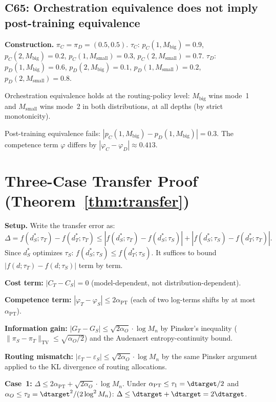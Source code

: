\documentclass[11pt]{article}
\newcommand{\Mn}{M_n}
\newcommand{\mismatch}{\varepsilon}
\begin{document}
\subsection{C65: Orchestration equivalence does not imply post-training equivalence}

\textbf{Construction.}
$\pi_C = \pi_D = (0.5, 0.5)$.
$\tau_C$: $p_C(1, M_{\mathrm{big}}) = 0.9$,
  $p_C(2, M_{\mathrm{big}}) = 0.2$,
  $p_C(1, M_{\mathrm{small}}) = 0.3$,
  $p_C(2, M_{\mathrm{small}}) = 0.7$.
$\tau_D$: $p_D(1, M_{\mathrm{big}}) = 0.6$,
  $p_D(2, M_{\mathrm{big}}) = 0.1$,
  $p_D(1, M_{\mathrm{small}}) = 0.2$,
  $p_D(2, M_{\mathrm{small}}) = 0.8$.

Orchestration equivalence holds at the routing-policy level:
$M_{\mathrm{big}}$ wins mode~1 and $M_{\mathrm{small}}$ wins mode~2
in both distributions, at all depths (by strict monotonicity).

Post-training equivalence fails:
$|p_C(1, M_{\mathrm{big}}) - p_D(1, M_{\mathrm{big}})| = 0.3$.
The competence term $\varphi$ differs by $|\varphi_C - \varphi_D|
\approx 0.413$.

\section{Three-Case Transfer Proof (Theorem~\ref{thm:transfer})}
\label{app:transfer}

\textbf{Setup.}
Write the transfer error as:
\[
  \Delta = f(d_S^*; \tau_T) - f(d_T^*; \tau_T)
  \le |f(d_S^*; \tau_T) - f(d_S^*; \tau_S)|
    + |f(d_S^*; \tau_S) - f(d_T^*; \tau_T)|.
\]
Since $d_S^*$ optimizes $\tau_S$: $f(d_S^*; \tau_S) \le f(d_T^*; \tau_S)$.
It suffices to bound $|f(d; \tau_T) - f(d; \tau_S)|$ term by term.

\textbf{Cost term:} $|C_T - C_S| = 0$ (model-dependent, not
distribution-dependent).

\textbf{Competence term:}
$|\varphi_T - \varphi_S| \le 2\alpha_{\mathrm{PT}}$ (each of two
log-terms shifts by at most $\alpha_{\mathrm{PT}}$).

\textbf{Information gain:}
$|G_T - G_S| \le \sqrt{2\alpha_O} \cdot \log\Mn$ by Pinsker's inequality
($\|\pi_S - \pi_T\|_{\mathrm{TV}} \le \sqrt{\alpha_O/2}$) and the
Audenaert entropy-continuity bound.

\textbf{Routing mismatch:}
$|\mismatch_T - \mismatch_S| \le \sqrt{2\alpha_O} \cdot \log\Mn$
by the same Pinsker argument applied to the KL divergence of routing
allocations.

\textbf{Case~1:}
$\Delta \le 2\alpha_{\mathrm{PT}} + \sqrt{2\alpha_O}\cdot\log\Mn$.
Under $\alpha_{\mathrm{PT}} \le \tau_1 = \dtarget/2$ and
$\alpha_O \le \tau_2 = \dtarget^2/(2\log^2\Mn)$:
$\Delta \le \dtarget + \dtarget = 2\dtarget$.
\end{document}

